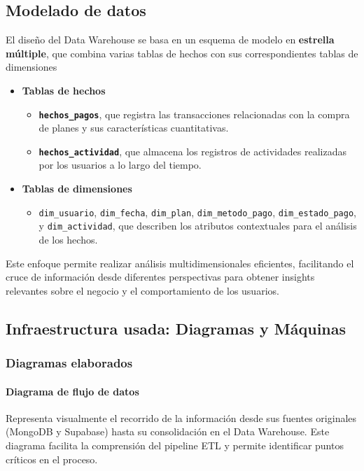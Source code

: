 \subsection{Modelado de datos}
El diseño del Data Warehouse se basa en un esquema de modelo en {\bfseries estrella múltiple}, que combina varias tablas de hechos con sus correspondientes tablas de dimensiones
\begin{itemize}
    \item {\bfseries Tablas de hechos} \par
    \begin{itemize}
        \item \texttt{\bfseries hechos\_pagos}, que registra las transacciones relacionadas con la compra de planes y sus características cuantitativas.
        \item \texttt{\bfseries hechos\_actividad}, que almacena los registros de actividades realizadas por los usuarios a lo largo del tiempo.
    \end{itemize}


\item {\bfseries Tablas de dimensiones}\par

\begin{itemize}
    \item \texttt{dim\_usuario}, \texttt{dim\_fecha}, \texttt{dim\_plan}, \texttt{dim\_metodo\_pago}, \texttt{dim\_estado\_pago}, y \texttt{dim\_actividad}, que describen los atributos contextuales para el análisis de los hechos.
\end{itemize}
\end{itemize}
Este enfoque permite realizar análisis multidimensionales eficientes, facilitando el cruce de información desde diferentes perspectivas para obtener insights relevantes sobre el negocio y el comportamiento de los usuarios.

\subsection{Infraestructura usada: Diagramas y Máquinas}
\subsubsection{Diagramas elaborados}
\paragraph{Diagrama de flujo de datos }Representa visualmente el recorrido de la información desde sus fuentes originales (MongoDB y Supabase) hasta su consolidación en el Data Warehouse. Este diagrama facilita la comprensión del pipeline ETL y permite identificar puntos críticos en el proceso.

